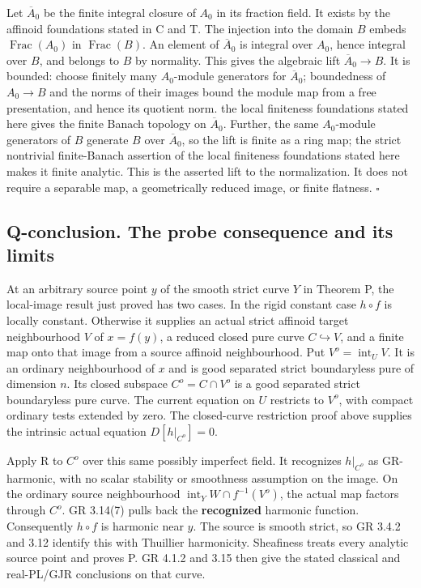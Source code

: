 \documentclass[
  10pt,
]{article}
\begin{document}
Let \(\overline A_0\) be the finite integral closure of \(A_0\) in its
fraction field. It exists by the affinoid foundations stated in C and T.
The injection into the domain \(B\) embeds \(\operatorname{Frac}(A_0)\)
in \(\operatorname{Frac}(B)\). An element of \(\overline A_0\) is
integral over \(A_0\), hence integral over \(B\), and belongs to \(B\)
by normality. This gives the algebraic lift \(\overline A_0\to B\). It
is bounded: choose finitely many \(A_0\)-module generators for
\(\overline A_0\); boundedness of \(A_0\to B\) and the norms of their
images bound the module map from a free presentation, and hence its
quotient norm. the local finiteness foundations stated here gives the
finite Banach topology on \(\overline A_0\). Further, the same
\(A_0\)-module generators of \(B\) generate \(B\) over
\(\overline A_0\), so the lift is finite as a ring map; the strict
nontrivial finite-Banach assertion of the local finiteness foundations
stated here makes it finite analytic. This is the asserted lift to the
normalization. It does not require a separable map, a geometrically
reduced image, or finite flatness. \(\square\)

\subsection{Q-conclusion. The probe consequence and its
limits}\label{q-conclusion.-the-probe-consequence-and-its-limits}

At an arbitrary source point \(y\) of the smooth strict curve \(Y\) in
Theorem P, the local-image result just proved has two cases. In the
rigid constant case \(h\circ f\) is locally constant. Otherwise it
supplies an actual strict affinoid target neighbourhood \(V\) of
\(x=f(y)\), a reduced closed pure curve \(C\hookrightarrow V\), and a
finite map onto that image from a source affinoid neighbourhood. Put
\(V^o=\operatorname{int}_U V\). It is an ordinary neighbourhood of \(x\)
and is good separated strict boundaryless pure of dimension \(n\). Its
closed subspace \(C^o=C\cap V^o\) is a good separated strict
boundaryless pure curve. The current equation on \(U\) restricts to
\(V^o\), with compact ordinary tests extended by zero. The closed-curve
restriction proof above supplies the intrinsic actual equation
\(D[h|_{C^o}]=0\).

Apply R to \(C^o\) over this same possibly imperfect field. It
recognizes \(h|_{C^o}\) as GR-harmonic, with no scalar stability or
smoothness assumption on the image. On the ordinary source neighbourhood
\(\operatorname{int}_Y W\cap f^{-1}(V^o)\), the actual map factors
through \(C^o\). GR 3.14(7) pulls back the \textbf{recognized} harmonic
function. Consequently \(h\circ f\) is harmonic near \(y\). The source
is smooth strict, so GR 3.4.2 and 3.12 identify this with Thuillier
harmonicity. Sheafiness treats every analytic source point and proves P.
GR 4.1.2 and 3.15 then give the stated classical and real-PL/GJR
conclusions on that curve.
\end{document}
